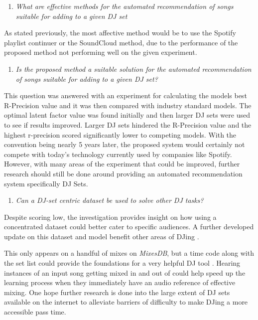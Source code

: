 \begin{enumerate}
	\item \textit{What are effective methods for the automated recommendation of songs suitable
		for adding to a given DJ set}
\end{enumerate}

As stated previously, the most affective method would be to use the Spotify playlist continuer or the SoundCloud method, due to the performance of the proposed method not performing well on the given experiment. 

\begin{enumerate}
	\item \textit{Is the proposed method a suitable solution for the automated recommendation of songs suitable for adding to a given DJ set?}
\end{enumerate}

This question was answered with an experiment for calculating the models best R-Precision value and it was then compared with industry standard models. The optimal latent factor value was found initially and then larger DJ sets were used to see if results improved. Larger DJ sets hindered the R-Precision value and the highest r-precision scored significantly lower to competing models. With the convention being nearly 5 years later, the proposed system would certainly not compete with today's technology currently used by companies like Spotify. However, with many areas of the experiment that could be improved, further research should still be done  around providing an automated recommendation system specifically DJ Sets.

\begin{enumerate}
	\item \textit{Can a DJ-set centric dataset be used to solve other DJ tasks?}
\end{enumerate}

Despite scoring low, the investigation provides insight on how using a concentrated dataset could better cater to specific audiences. A further developed update on this dataset and model benefit other areas of DJing . 

This only appears on a handful of mixes on \textit{MixesDB}, but a time code along with the set list could provide the foundations for a very helpful DJ tool \citep{mixesdb_2015-01-02_2015}. Hearing instances of an input song getting mixed in and out of could help speed up the learning process when they immediately have an audio reference of effective mixing. One hope further research is done into the large extent of DJ sets available on the internet to alleviate barriers of difficulty to make DJing a more accessible pass time. 

